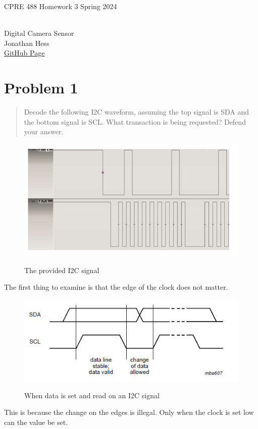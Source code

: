 \documentclass[10pt,a4paper]{article}
\author{}
\date{}
\begin{document}
\begin{flushleft}
\begin{LARGE}CPRE 488 Homework 3 Spring 2024
\end{LARGE}
\\Digital Camera Sensor
\\Jonathan Hess
\\\href{https://github.com/Jetsama/CPRE488/tree/main/HW3}{GitHub Page}
\end{flushleft}

\section{Problem 1}
\begin{quote}
Decode the following I2C waveform, assuming the top signal is SDA and the bottom signal is SCL. What
transaction is being requested? Defend your answer.
\end{quote}

\begin{figure}[H]
\centering
\includegraphics[width=5in]{images/Problem1.png} \\
\caption{The provided I2C signal}
\end{figure}
The first thing to examine is that the edge of the clock does not matter.
\begin{figure}[H]
\centering
\includegraphics[width=5in]{images/i2c_bit_trnsf.jpg} \\
\caption{When data is set and read on an I2C signal\cite{jeremy}}
\end{figure}
This is because the change on the edges is illegal. Only when the clock is set low can the value be set.
\end{document}
